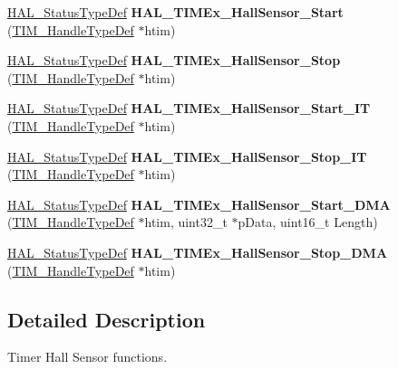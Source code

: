 \begin{DoxyCompactItemize}
\item 
\mbox{\label{group___t_i_m_ex___exported___functions___group1_ga9f4bfa2a4b890a2219ca927bbbb455fc}} 
\hyperlink{stm32f4xx__hal__def_8h_a63c0679d1cb8b8c684fbb0632743478f}{H\+A\+L\+\_\+\+Status\+Type\+Def} {\bfseries H\+A\+L\+\_\+\+T\+I\+M\+Ex\+\_\+\+Hall\+Sensor\+\_\+\+Start} (\hyperlink{struct_t_i_m___handle_type_def}{T\+I\+M\+\_\+\+Handle\+Type\+Def} $\ast$htim)
\item 
\mbox{\label{group___t_i_m_ex___exported___functions___group1_ga714c2a7a51f4ab61b04df84ab182eb86}} 
\hyperlink{stm32f4xx__hal__def_8h_a63c0679d1cb8b8c684fbb0632743478f}{H\+A\+L\+\_\+\+Status\+Type\+Def} {\bfseries H\+A\+L\+\_\+\+T\+I\+M\+Ex\+\_\+\+Hall\+Sensor\+\_\+\+Stop} (\hyperlink{struct_t_i_m___handle_type_def}{T\+I\+M\+\_\+\+Handle\+Type\+Def} $\ast$htim)
\item 
\mbox{\label{group___t_i_m_ex___exported___functions___group1_gaf3e7068c5bc6fc74e016cc8e990cbb02}} 
\hyperlink{stm32f4xx__hal__def_8h_a63c0679d1cb8b8c684fbb0632743478f}{H\+A\+L\+\_\+\+Status\+Type\+Def} {\bfseries H\+A\+L\+\_\+\+T\+I\+M\+Ex\+\_\+\+Hall\+Sensor\+\_\+\+Start\+\_\+\+IT} (\hyperlink{struct_t_i_m___handle_type_def}{T\+I\+M\+\_\+\+Handle\+Type\+Def} $\ast$htim)
\item 
\mbox{\label{group___t_i_m_ex___exported___functions___group1_gac6ab7ab0cada425a8d4deb637bd2ad71}} 
\hyperlink{stm32f4xx__hal__def_8h_a63c0679d1cb8b8c684fbb0632743478f}{H\+A\+L\+\_\+\+Status\+Type\+Def} {\bfseries H\+A\+L\+\_\+\+T\+I\+M\+Ex\+\_\+\+Hall\+Sensor\+\_\+\+Stop\+\_\+\+IT} (\hyperlink{struct_t_i_m___handle_type_def}{T\+I\+M\+\_\+\+Handle\+Type\+Def} $\ast$htim)
\item 
\mbox{\label{group___t_i_m_ex___exported___functions___group1_ga3d0d063498f6888d61411d56380f5211}} 
\hyperlink{stm32f4xx__hal__def_8h_a63c0679d1cb8b8c684fbb0632743478f}{H\+A\+L\+\_\+\+Status\+Type\+Def} {\bfseries H\+A\+L\+\_\+\+T\+I\+M\+Ex\+\_\+\+Hall\+Sensor\+\_\+\+Start\+\_\+\+D\+MA} (\hyperlink{struct_t_i_m___handle_type_def}{T\+I\+M\+\_\+\+Handle\+Type\+Def} $\ast$htim, uint32\+\_\+t $\ast$p\+Data, uint16\+\_\+t Length)
\item 
\mbox{\label{group___t_i_m_ex___exported___functions___group1_gab361d1aa6e0eb244886b93908beded6f}} 
\hyperlink{stm32f4xx__hal__def_8h_a63c0679d1cb8b8c684fbb0632743478f}{H\+A\+L\+\_\+\+Status\+Type\+Def} {\bfseries H\+A\+L\+\_\+\+T\+I\+M\+Ex\+\_\+\+Hall\+Sensor\+\_\+\+Stop\+\_\+\+D\+MA} (\hyperlink{struct_t_i_m___handle_type_def}{T\+I\+M\+\_\+\+Handle\+Type\+Def} $\ast$htim)
\end{DoxyCompactItemize}


\subsection{Detailed Description}
Timer Hall Sensor functions. 

